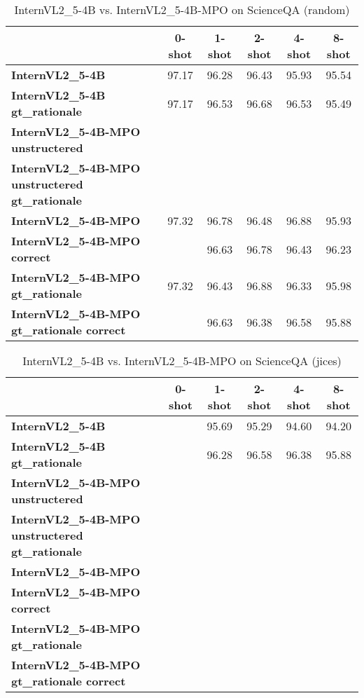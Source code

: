 \begin{table}
\caption{InternVL2\_5-4B vs. InternVL2\_5-4B-MPO on ScienceQA (random)}
\label{tab:InternVL2_5-4B_ScienceQA_TRAIN_random}
\begin{tabular}{lccccc}
\toprule
 & 0-shot & 1-shot & 2-shot & 4-shot & 8-shot \\
\midrule
\textbf{InternVL2\_5-4B} & 97.17 & 96.28 & 96.43 & 95.93 & 95.54 \\
\textbf{InternVL2\_5-4B gt\_rationale} & 97.17 & 96.53 & 96.68 & 96.53 & 95.49 \\
\textbf{InternVL2\_5-4B-MPO unstructered} &  &  &  &  &  \\
\textbf{InternVL2\_5-4B-MPO unstructered gt\_rationale} &  &  &  &  &  \\
\textbf{InternVL2\_5-4B-MPO} & 97.32 & 96.78 & 96.48 & 96.88 & 95.93 \\
\textbf{InternVL2\_5-4B-MPO correct} &  & 96.63 & 96.78 & 96.43 & 96.23 \\
\textbf{InternVL2\_5-4B-MPO gt\_rationale} & 97.32 & 96.43 & 96.88 & 96.33 & 95.98 \\
\textbf{InternVL2\_5-4B-MPO gt\_rationale correct} &  & 96.63 & 96.38 & 96.58 & 95.88 \\
\bottomrule
\end{tabular}
\end{table}


\begin{table}
\caption{InternVL2\_5-4B vs. InternVL2\_5-4B-MPO on ScienceQA (jices)}
\label{tab:InternVL2_5-4B_ScienceQA_TRAIN_jices}
\begin{tabular}{lccccc}
\toprule
 & 0-shot & 1-shot & 2-shot & 4-shot & 8-shot \\
\midrule
\textbf{InternVL2\_5-4B} &  & 95.69 & 95.29 & 94.60 & 94.20 \\
\textbf{InternVL2\_5-4B gt\_rationale} &  & 96.28 & 96.58 & 96.38 & 95.88 \\
\textbf{InternVL2\_5-4B-MPO unstructered} &  &  &  &  &  \\
\textbf{InternVL2\_5-4B-MPO unstructered gt\_rationale} &  &  &  &  &  \\
\textbf{InternVL2\_5-4B-MPO} &  &  &  &  &  \\
\textbf{InternVL2\_5-4B-MPO correct} &  &  &  &  &  \\
\textbf{InternVL2\_5-4B-MPO gt\_rationale} &  &  &  &  &  \\
\textbf{InternVL2\_5-4B-MPO gt\_rationale correct} &  &  &  &  &  \\
\bottomrule
\end{tabular}
\end{table}


